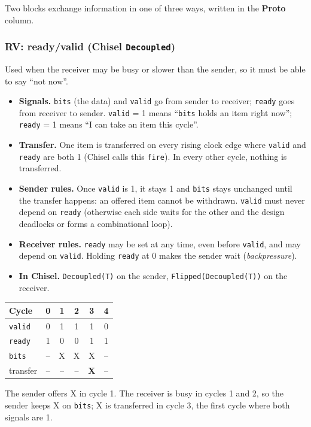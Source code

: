 \documentclass{article}
\begin{document}
Two blocks exchange information in one of three ways, written in the \textbf{Proto} column.

\subsubsection*{RV: ready/valid (Chisel \texttt{Decoupled})}

Used when the receiver may be busy or slower than the sender, so it must be able to say ``not now''.

\begin{itemize}
  \item \textbf{Signals.} \texttt{bits} (the data) and \texttt{valid} go from sender to receiver;
        \texttt{ready} goes from receiver to sender.
        \texttt{valid} = 1 means ``\texttt{bits} holds an item right now''; \texttt{ready} = 1 means ``I can take an item this cycle''.
  \item \textbf{Transfer.} One item is transferred on every rising clock edge where \texttt{valid} and \texttt{ready}
        are both 1 (Chisel calls this \texttt{fire}). In every other cycle, nothing is transferred.
  \item \textbf{Sender rules.} Once \texttt{valid} is 1, it stays 1 and \texttt{bits} stays unchanged until the
        transfer happens: an offered item cannot be withdrawn. \texttt{valid} must never depend on \texttt{ready}
        (otherwise each side waits for the other and the design deadlocks or forms a combinational loop).
  \item \textbf{Receiver rules.} \texttt{ready} may be set at any time, even before \texttt{valid}, and may depend on \texttt{valid}.
        Holding \texttt{ready} at 0 makes the sender wait (\emph{backpressure}).
  \item \textbf{In Chisel.} \texttt{Decoupled(T)} on the sender, \texttt{Flipped(Decoupled(T))} on the receiver.
\end{itemize}

\begin{center}\small
\begin{tabular}{l ccccc}
  \toprule
  Cycle            & 0 & 1 & 2 & 3 & 4 \\
  \midrule
  \texttt{valid}   & 0 & 1 & 1 & 1 & 0 \\
  \texttt{ready}   & 1 & 0 & 0 & 1 & 1 \\
  \texttt{bits}    & -- & X & X & X & -- \\
  transfer         & -- & -- & -- & \textbf{X} & -- \\
  \bottomrule
\end{tabular}
\end{center}
The sender offers X in cycle 1. The receiver is busy in cycles 1 and 2, so the sender keeps X on \texttt{bits};
X is transferred in cycle 3, the first cycle where both signals are 1.
\end{document}
